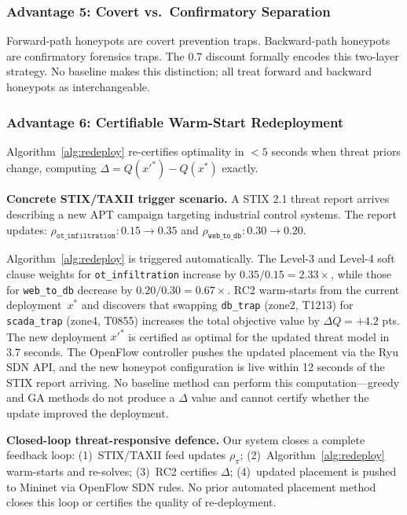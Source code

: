 \documentclass[journal]{IEEEtran}
\begin{document}
\subsubsection{Advantage 5: Covert vs.\ Confirmatory Separation}

Forward-path honeypots are covert prevention traps.
Backward-path honeypots are confirmatory forensics traps.
The 0.7 discount formally encodes this two-layer strategy.
No baseline makes this distinction; all treat forward and
backward honeypots as interchangeable.

\subsubsection{Advantage 6: Certifiable Warm-Start Redeployment}

Algorithm~\ref{alg:redeploy} re-certifies optimality in
$<5$ seconds when threat priors change, computing
$\Delta=Q(x'^*)-Q(x^*)$ exactly.

\begin{examplebox}
\textbf{Concrete STIX/TAXII trigger scenario.}
A STIX 2.1 threat report arrives describing a new APT
campaign targeting industrial control systems.
The report updates:
$\rho_{\texttt{ot\_infiltration}}: 0.15 \to 0.35$
and
$\rho_{\texttt{web\_to\_db}}: 0.30 \to 0.20$.

Algorithm~\ref{alg:redeploy} is triggered automatically.
The Level-3 and Level-4 soft clause weights for
\texttt{ot\_infiltration} increase by $0.35/0.15 = 2.33\times$,
while those for \texttt{web\_to\_db} decrease by
$0.20/0.30 = 0.67\times$.
RC2 warm-starts from the current deployment~$x^*$ and
discovers that swapping \texttt{db\_trap} (zone2, T1213)
for \texttt{scada\_trap} (zone4, T0855) increases the
total objective value by $\Delta Q = +4.2$ pts.
The new deployment $x'^*$ is certified as optimal for
the updated threat model in 3.7 seconds.
The OpenFlow controller pushes the updated placement via
the Ryu SDN API, and the new honeypot configuration
is live within 12 seconds of the STIX report arriving.
No baseline method can perform this computation---greedy
and GA methods do not produce a $\Delta$ value and cannot
certify whether the update improved the deployment.
\end{examplebox}

\begin{insightbox}
\textbf{Closed-loop threat-responsive defence.}
Our system closes a complete feedback loop:
(1)~STIX/TAXII feed updates $\rho_\pi$;
(2)~Algorithm~\ref{alg:redeploy} warm-starts and re-solves;
(3)~RC2 certifies $\Delta$;
(4)~updated placement is pushed to Mininet via OpenFlow
SDN rules.
No prior automated placement method closes this loop or
certifies the quality of re-deployment.
\end{insightbox}
\end{document}
